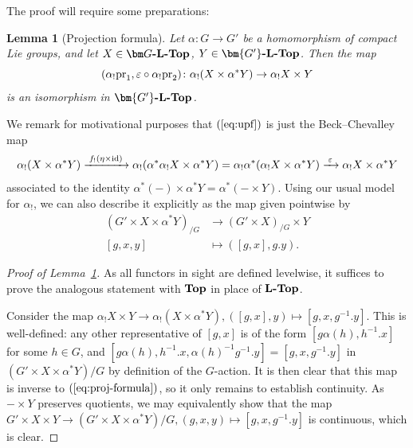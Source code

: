 \documentclass[reqno]{memo-l}
\theoremstyle{mythm}
\newtheorem{lemma}[thm]{Lemma}
\theoremstyle{definition}
\numberwithin{equation}{section}
\renewcommand{\epsilon}{\varepsilon}
\newcommand{\cat}[1]{\textbf{\textup{#1}}}
\newcommand{\id}{\textup{id}}
\newcommand{\pr}{\textup{pr}}
\begin{document}
The proof will require some preparations:

\begin{lemma}[Projection formula]\label{lemma:proj-formula-underived}
    Let $\alpha\colon G\to G'$ be a homomorphism of compact Lie groups, and let $X\in\cat{$\bm G$-$\cat{L}$-Top}$, $Y\in\cat{$\bm{G'}$-$\cat{L}$-Top}$. Then the map
    \begin{equation}\label{eq:upf}
        (\alpha_!\pr_1, \epsilon\circ \alpha_!\pr_2)\colon \alpha_!(X\times \alpha^*Y)\to \alpha_!X\times Y
    \end{equation}
    is an isomorphism in $\cat{$\bm{G'}$-$\cat{L}$-Top}$.
\end{lemma}

We remark for motivational purposes that $(\ref{eq:upf})$ is just the Beck--Chevalley map
\[
    \alpha_!(X\times \alpha^*Y)\xrightarrow{\;f_!(\eta\times\id)\;}
    \alpha_!(\alpha^*\alpha_!X\times \alpha^*Y)=\alpha_!\alpha^*(\alpha_!X\times \alpha^*Y)\xrightarrow{\;\epsilon\;}\alpha_!X\times \alpha^*Y
\]
associated to the identity $\alpha^*(-)\times \alpha^*Y= \alpha^*(-\times Y)$. Using our usual model for $\alpha_!$, we can also describe it explicitly as the map given pointwise by
\begin{equation}\label{eq:proj-formula}
    \begin{aligned}
        (G'\times X\times \alpha^*Y)_{/G}&\longrightarrow (G'\times X)_{/G}\times Y\\
        [g,x,y]&\longmapsto ([g,x],g.y).
    \end{aligned}
\end{equation}

\begin{proof}[Proof of Lemma~\ref{lemma:proj-formula-underived}]
    As all functors in sight are defined levelwise, it suffices to prove the analogous statement with $\cat{Top}$ in place of $\cat{$\cat{L}$-Top}$. 

    Consider the map $\alpha_!X\times Y\to \alpha_!(X\times \alpha^*Y),([g,x],y)\mapsto [g,x,g^{-1}.y]$. This is well-defined: any other representative of $[g,x]$ is of the form $[g\alpha(h), h^{-1}.x]$ for some $h\in G$, and $[g\alpha(h),h^{-1}.x,\alpha(h)^{-1}g^{-1}.y]=[g,x,g^{-1}.y]$ in $(G'\times X\times \alpha^*Y)/G$ by definition of the $G$-action. It is then clear that this map is inverse to $(\ref{eq:proj-formula})$, so it only remains to establish continuity. As $-\times Y$ preserves quotients, we may equivalently show that the map $G'\times X\times Y\to (G'\times X\times \alpha^*Y)/G, (g,x,y)\mapsto [g,x,g^{-1}.y]$ is continuous, which is clear.
\end{proof}
\end{document}
